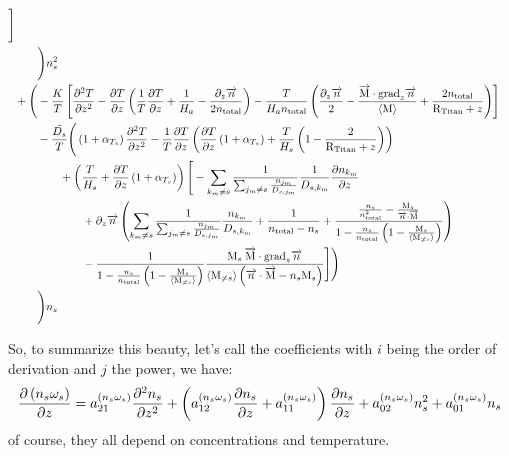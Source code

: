 \begin{landscape}
\begin{equation}
\begin{split}
                \Bigg]\\
& \qquad\Bigg)n_s^2\\
& + \Bigg( - \frac{K}{T} 
          \left[ \frac{\partial^2T}{\partial{z}^2} 
           - \frac{\partial T}{\partial z}\left(\frac{1}{T}\frac{\partial T}{\partial z} + \frac{1}{H_a} - \frac{\partial_{z}{\overrightarrow{n}}}{2n_\text{total}}\right)
           - \frac{T}{H_an_\text{total}}
                             \left(
                                  \frac{\partial_{z}{\overrightarrow{n}}}{2}
                                - \frac{\overrightarrow{\text{M}}\cdot\text{grad}_{z}\overrightarrow{n}}{\langle\text{M}\rangle}
                                + \frac{2n_\text{total}}{\text{R}_\text{Titan} + z} 
                            \right)
          \right]  \\
& \qquad - \frac{\tilde{D_s}}{T}
                \Bigg(
                        \left(1 + \alpha_{T_s}\right)\frac{\partial^2T}{\partial{z}^2} 
                      - \frac{1}{T}\frac{\partial T}{\partial z}\left(\frac{\partial T}{\partial z}\left(1 + \alpha_{T_s}\right)
                                         + \frac{T}{H_s}\left(1 - \frac{2}{\text{R}_\text{Titan} + z}\right)
                                   \right)
             \\
&\qquad\qquad + \left(\frac{T}{H_s} + \frac{\partial T}{\partial z}\left(1 + \alpha_{T_s}\right)\right)
\Bigg[ - \sum_{k_m\neq s}\frac{1}{\sum_{j_m \neq s}\frac{n_{j_m}}{D_{s,j_m}}}
                                \frac{1}{D_{s,k_m}} \frac{\partial n_{k_m}}{\partial z} \\
& \qquad\qquad\qquad + \partial_{z}{\overrightarrow{n}}
                 \left(\sum_{k_m\neq s}\frac{1}{\sum_{j_m \neq s}\frac{n_{j_m}}{D_{s,j_m}}}\frac{n_{k_m}}{D_{s,k_m}}
                      + \frac{1}{n_\text{total} - n_s}
                      + \frac{\frac{n_s}{n_\text{total}^2} - \frac{\text{M}_s}{\overrightarrow{n}\cdot\overrightarrow{\text{M}}}}
                             {1-\frac{n_s}{n_\text{total}}\left(1 - \frac{\text{M}_s}{\langle\text{M}_{\neq s}\rangle}\right)}
                 \right) \\
&\qquad\qquad\qquad 
               - \frac{1}{1-\frac{n_s}{n_\text{total}}\left(1 - \frac{\text{M}_s}{\langle\text{M}_{\neq s}\rangle}\right)}
                           \frac{\text{M}_s\:\overrightarrow{\text{M}}\cdot\text{grad}_{z}\overrightarrow{n}}
                                 {\langle\text{M}_{\neq s}\rangle\left(\overrightarrow{n}\cdot\overrightarrow{\text{M}} - n_s\text{M}_s\right)}
\Bigg]
\Bigg)\\
& \qquad\Bigg)n_s
\end{split}
\label{Titan:diff_nw_deriv}
\end{equation}
\end{landscape}
So, to summarize this beauty, let's call the coefficients  with
$i$ being the order of derivation and $j$ the power, we have:
\begin{equation}
\frac{\partial\left(n_s\omega_s\right)}{\partial z} = a^{(n_s\omega_s)}_{21} \frac{\partial^2n_s}{\partial{z}^2}
                            + \left(a^{(n_s\omega_s)}_{12} \frac{\partial n_s}{\partial z} + a^{(n_s\omega_s)}_{11}\right)\frac{\partial n_s}{\partial z}
                            + a^{(n_s\omega_s)}_{02} n_s^2
                            + a^{(n_s\omega_s)}_{01} n_s
\label{Titan:diff_final_der}
\end{equation}
of course, they all depend on concentrations and temperature.
